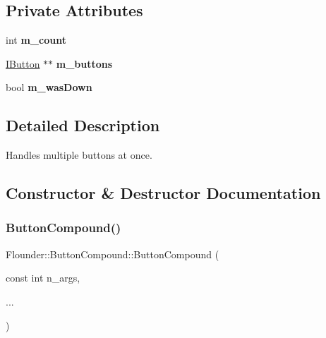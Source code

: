 \subsection*{Private Attributes}
\begin{DoxyCompactItemize}
\item 
\mbox{\label{class_flounder_1_1_button_compound_ae55d1299a757028308ae302c9d47f376}} 
int {\bfseries m\+\_\+count}
\item 
\mbox{\label{class_flounder_1_1_button_compound_a68d28a3a93446421ea9b697dafd41bf2}} 
\hyperlink{class_flounder_1_1_i_button}{I\+Button} $\ast$$\ast$ {\bfseries m\+\_\+buttons}
\item 
\mbox{\label{class_flounder_1_1_button_compound_a238b401d46df41edd85f5219cd3f012c}} 
bool {\bfseries m\+\_\+was\+Down}
\end{DoxyCompactItemize}


\subsection{Detailed Description}
Handles multiple buttons at once. 



\subsection{Constructor \& Destructor Documentation}
\mbox{\label{class_flounder_1_1_button_compound_ae08de283f9875ae9b84c25742cb3af64}} 
\subsubsection{\texorpdfstring{Button\+Compound()}{ButtonCompound()}}
{\footnotesize\ttfamily Flounder\+::\+Button\+Compound\+::\+Button\+Compound (\begin{DoxyParamCaption}\item[{const int}]{n\+\_\+args,  }\item[{}]{... }\end{DoxyParamCaption})}




